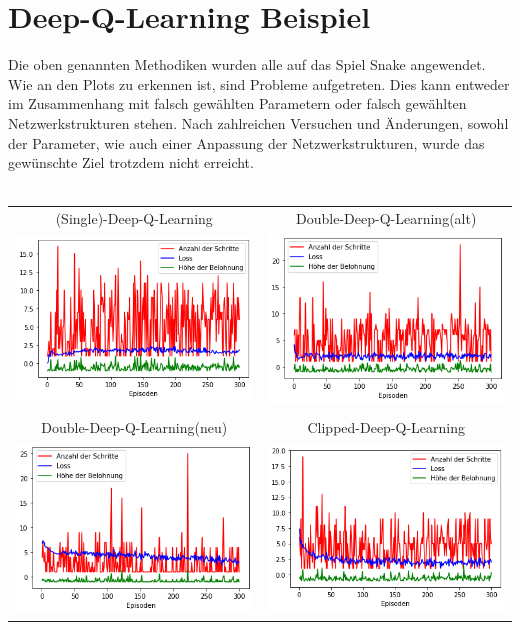 \documentclass[12pt,titlepage]{article}
\begin{document}
\section{Deep-Q-Learning Beispiel}
Die oben genannten Methodiken wurden alle auf das Spiel Snake angewendet. Wie an den Plots zu erkennen ist, sind Probleme aufgetreten. Dies kann entweder im Zusammenhang mit falsch gewählten Parametern oder falsch gewählten Netzwerkstrukturen stehen. Nach zahlreichen Versuchen und Änderungen, sowohl der Parameter, wie auch einer Anpassung der Netzwerkstrukturen, wurde das gewünschte Ziel trotzdem nicht erreicht.  
\\\\
\begin{tabular}{cc}
(Single)-Deep-Q-Learning & Double-Deep-Q-Learning(alt)\\
\includegraphics[width=7.2cm]{SDQL.png} & \includegraphics[width=7.2cm]{ADDQL.png}\\
&\\
Double-Deep-Q-Learning(neu) & Clipped-Deep-Q-Learning\\
\includegraphics[width=7.2cm]{DDQL.png} & \includegraphics[width=7.2cm]{CDQL.png}
\end{tabular}
\end{document}
